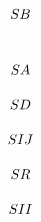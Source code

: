 \documentclass[10pt]{article}
\begin{document}
\[\begin{tikzpicture}
%
\node[]  at (-3em,6.5em) {$SB$};
%
%
%
%
\node[]  at (-3em,2.5em) {$SA$};
\node[]  at (-3em,0em) {$SD$};
\node[]  at (-3em,-2.5em) {$SIJ$};
\node[]  at (-3em,-5em) {$SR$};
\node[]  at (-3em,-7.5em) {$SII$};
%
%
\end{tikzpicture}
\]
\end{document}
